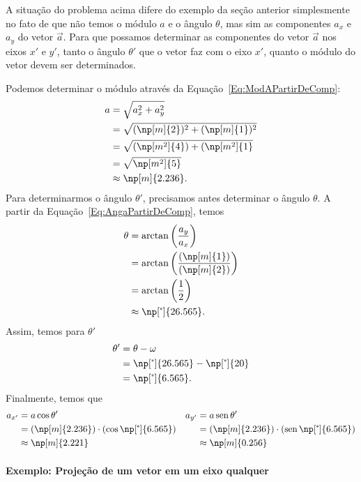 A situação do problema acima difere do exemplo da seção anterior simplesmente no fato de que não temos o módulo $a$ e o ângulo $\theta$, mas sim as componentes $a_x$ e $a_y$ do vetor $\vec{a}$. Para que possamos determinar as componentes do vetor $\vec{a}$ nos eixos $x'$ e $y'$, tanto o ângulo $\theta'$ que o vetor faz com o eixo $x'$, quanto o módulo do vetor devem ser determinados.

Podemos determinar o módulo através da Equação~\eqref{Eq:ModAPartirDeComp}:
\begin{align}
    a &= \sqrt{a_x^2 + a_y^2} \\
    &= \sqrt{(\np[m]{2})^2 + (\np[m]{1})^2} \\
    &= \sqrt{(\np[m^2]{4}) + (\np[m^2]{1}} \\
    &= \sqrt{\np[m^2]{5}} \\
    &\approx \np[m]{2.236}.
\end{align}
%
Para determinarmos o ângulo $\theta'$, precisamos antes determinar o ângulo $\theta$. A partir da Equação~\eqref{Eq:AngaPartirDeComp}, temos
\begin{align}
    \theta &= \arctan\left(\frac{a_y}{a_x}\right) \\
    &= \arctan\left(\frac{(\np[m]{1})}{(\np[m]{2})}\right) \\
    &=\arctan\left(\frac{1}{2}\right) \\
    &\approx \np[\tcdegree]{26.565}.
\end{align}
%
Assim, temos para $\theta'$
\begin{align}
    \theta' &= \theta - \omega \\
    &= \np[\tcdegree]{26.565} - \np[\tcdegree]{20} \\
    &= \np[\tcdegree]{6.565}.
\end{align}
%
Finalmente, temos que
\begin{align}
    a_{x'} &= a\cos\theta' & a_{y'} &= a\sen\theta' \\
    &= (\np[m]{2.236})\cdot(\cos\np[\tcdegree]{6.565}) & &= (\np[m]{2.236})\cdot(\sen\np[\tcdegree]{6.565}) \\
    &\approx \np[m]{2.221} & &\approx \np[m]{0.256}
\end{align}

\paragraph{Exemplo: Projeção de um vetor em um eixo qualquer}


